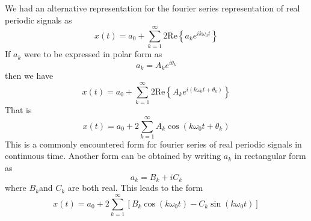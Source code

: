 \documentclass{report}
\begin{document}
We had an alternative representation for the fourier series representation of real periodic signals as
\begin{equation*}
x(t)=a_0+\sum^\infty_{k=1}2\text{Re}\left\{a_ke^{ik\omega_0t}\right\}
\end{equation*}
If $a_k$ were to be expressed in polar form as
\begin{equation*}
a_k=A_ke^{i\theta_k}
\end{equation*}
then we have 
\begin{equation*}
x(t)=a_0+\sum^\infty_{k=1}2\text{Re}\left\{A_ke^{i(k\omega_0t+\theta_k)}\right\}
\end{equation*}
That is
\begin{equation*}
x(t)=a_0+2\sum^\infty_{k=1}A_k\cos(k\omega_0t+\theta_k)
\end{equation*}
This is a commonly encountered form for fourier series of real periodic signals in continuous time. 
Another form can be obtained by writing $a_k$ in rectangular form as
\begin{equation*}
a_k=B_k+iC_k
\end{equation*}
where $B_k$and $C_k$ are both real. This leads to the form
\begin{equation*}
x(t)=a_0+2\sum^\infty_{k=1}[B_k\cos(k\omega_0t)-C_k\sin(k\omega_0t)]
\end{equation*}
\newpage
\end{document}

